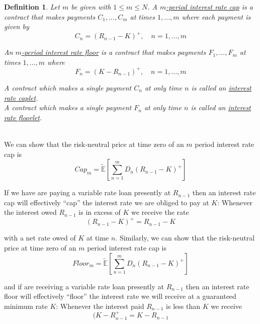 \documentclass[12pt]{article}
\newtheorem{definition}{Definition}
\newlength\tindent
\renewcommand{\indent}{\hspace*{\tindent}}
\newcommand{\E}{\mathbb E}
\begin{document}
\begin{definition} Let $m$ be given with $1 \leq m \leq N$. A \underline{$m$-period interest rate cap} is a contract that makes payments $C_1,...,C_m$ at times $1,...,m$ where each payment is given by
\begin{equation*}
	C_n = (R_{n - 1} - K)^+, \quad n = 1,...,m
\end{equation*}

\indent An \underline{$m$-period interest rate floor} is a contract that makes payments $F_1,...,F_m$ at times $1,...,m$ where
\begin{equation*}
	F_n = (K - R_{n - 1})^+, \quad n = 1,...,m
\end{equation*}

A contract which makes a single payment $C_n$ at only time $n$ is called an \underline{interest rate caplet}. \\

A contract which makes a single payment $F_n$ at only time $n$ is called an \underline{interest rate floorlet}. \\
\end{definition} \hfill\\

We can show that the risk-neutral price at time zero of an $m$ period interest rate cap is
\begin{equation*}
	Cap_m = \tilde{\E} \left[ \sum^m_{n = 1} D_n(R_{n - 1} - K)^+ \right]
\end{equation*}

\indent If we have are paying a variable rate loan presently at $R_{n - 1}$ then an interest rate cap will effectively ``cap'' the interest rate we are obliged to pay at $K$: Whenever the interest owed $R_{n - 1}$ is in excess of $K$ we receive the rate
\begin{equation*}
	(R_{n - 1} - K)^+ = R_{n - 1} - K
\end{equation*}

with a net rate owed of $K$ at time $n$. Similarly, we can show that the risk-neutral price at time zero of an $m$ period interest rate cap is
\begin{equation*}
	Floor_m = \tilde{\E} \left[ \sum^m_{n = 1} D_n(R_{n - 1} - K)^+ \right]
\end{equation*}

and if are receiving a variable rate loan presently at $R_{n - 1}$ then an interest rate floor will effectively ``floor'' the interest rate we will receive at a guaranteed minimum rate $K$: Whenever the interest paid $R_{n - 1}$ is less than $K$ we receive
\begin{equation*}
	(K - R_{n - 1}^+ = K - R_{n - 1}
\end{equation*}
\end{document}
